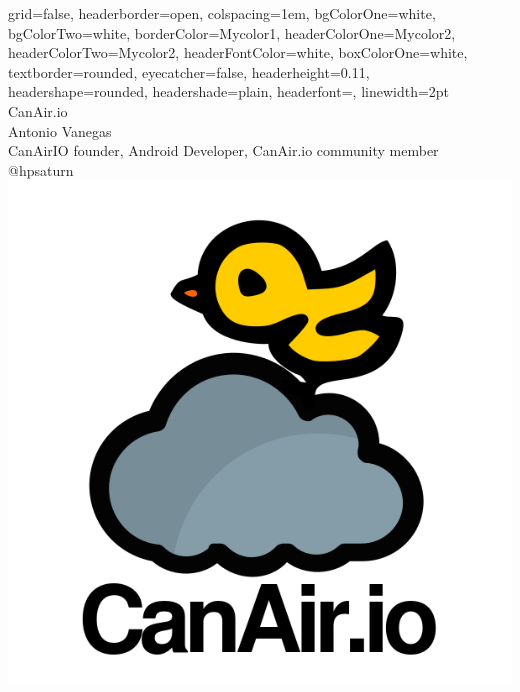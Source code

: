 \documentclass[a0paper,portrait]{baposter}
\begin{document}

\begin{poster}
{
grid=false,
headerborder=open, %
colspacing=1em, %
bgColorOne=white, %
bgColorTwo=white, %
borderColor=Mycolor1, %
headerColorOne=Mycolor2, %
headerColorTwo=Mycolor2, %
headerFontColor=white, %
boxColorOne=white, %
textborder=rounded, %
eyecatcher=false, %
headerheight=0.11\textheight, %
headershape=rounded, %
headershade=plain,
headerfont=\Large\textsf, %
linewidth=2pt %
}
{}
%
%
{
\textsf %
{
{CanAir.io}
}
} %
{\sf\vspace{0.2em}\\
Antonio Vanegas  %
\vspace{0.1em}\\
\small{ CanAirIO founder, Android Developer, CanAir.io community member
\vspace{0.2em}\\
@hpsaturn  %
}
}
{\includegraphics[width=.18\linewidth]{logo.png}} %



\end{poster}
\end{document}

